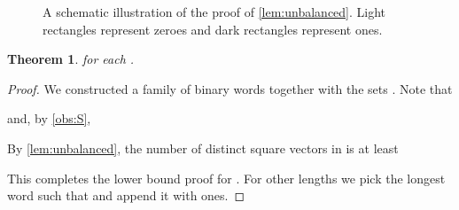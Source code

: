 \documentclass{article}
\theoremstyle{plain}
\newtheorem{theorem}{Theorem}[section]
\theoremstyle{definition}
\theoremstyle{remark}
\begin{document}
  \begin{figure}[t]
    \centering
    \def\blockH{0.6}
\newcommand{\drawBlock}[4]{
  \draw[fill=white] (#1,0)--(#1/2+#2/2,0)--(#1/2+#2/2,\blockH)--(#1,\blockH)--cycle;
  \draw[fill=white!70!black] (#1/2+#2/2,0)--(#2,0)--(#2,\blockH)--(#1/2+#2/2,\blockH)--cycle;
  \node at (#1+#2/4-#1/4,\blockH) [above] {\small #3};
  \node at (#1/2+#2/2+#2/4-#1/4,\blockH) [above] {\small #4};
}
     \caption{\label{fig:unbalanced}
      A schematic illustration of the proof of \cref{lem:unbalanced}.
      Light rectangles represent zeroes and dark rectangles represent ones.
    }
  \end{figure}

  \begin{theorem}
     for each .
  \end{theorem}
  \begin{proof}
    We constructed a family of binary words  together with the sets .
    Note that 
    
    and, by \cref{obs:S},
    
    By \cref{lem:unbalanced}, the number of distinct square vectors in  is at least
    
    This completes the lower bound proof for .
    For other lengths  we pick the longest word  such that 
    and append it with ones.
  \end{proof}
\end{document}
